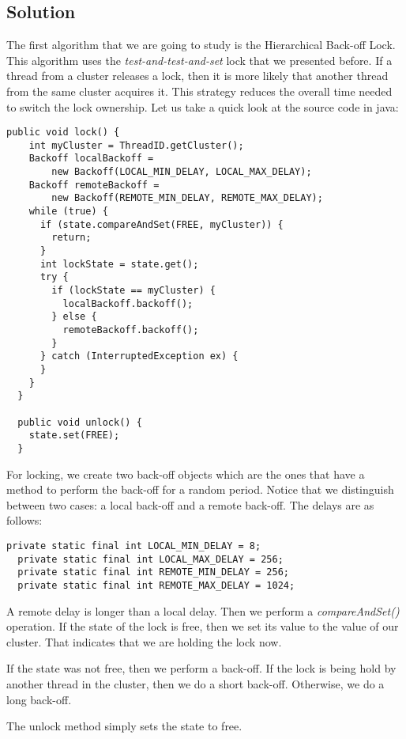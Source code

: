 \subsection{Solution}
\par
The first algorithm that we are going to study is the Hierarchical Back-off Lock.
This algorithm uses the \textit{test-and-test-and-set} lock that we presented
before. If a thread from a cluster releases a lock, then it is more likely that
another thread from the same cluster acquires it. This strategy reduces the
overall time needed to switch the lock ownership. Let us take a quick look at the
source code in java:
\par
\hfill
\begin{lstlisting}[style=numbers]
  public void lock() {
    int myCluster = ThreadID.getCluster();
    Backoff localBackoff =
        new Backoff(LOCAL_MIN_DELAY, LOCAL_MAX_DELAY);
    Backoff remoteBackoff =
        new Backoff(REMOTE_MIN_DELAY, REMOTE_MAX_DELAY);
    while (true) {
      if (state.compareAndSet(FREE, myCluster)) {
        return;
      }   
      int lockState = state.get();
      try {
        if (lockState == myCluster) {
          localBackoff.backoff();
        } else {
          remoteBackoff.backoff();
        }   
      } catch (InterruptedException ex) {
      }   
    }   
  }
  
  public void unlock() {
    state.set(FREE);
  }
\end{lstlisting}
\hfill
\par
For locking, we create two back-off objects which are the ones that have a method to
perform the back-off for a random period. Notice that we distinguish between two
cases: a local back-off and a remote back-off. The delays are as follows:
\par
\hfill
\begin{lstlisting}[style=numbers]
  private static final int LOCAL_MIN_DELAY = 8;
  private static final int LOCAL_MAX_DELAY = 256;
  private static final int REMOTE_MIN_DELAY = 256;
  private static final int REMOTE_MAX_DELAY = 1024;
\end{lstlisting}
\hfill
\par
A remote delay is longer than a local delay. Then we perform a
\textit{compareAndSet()} operation. If the state of the lock is free, then we
set its value to the value of our cluster. That indicates that we are holding
the lock now.
\par
If the state was not free, then we perform a back-off. If the lock is being hold
by another thread in the cluster, then we do a short back-off. Otherwise, we do a
long back-off.
\par
The unlock method simply sets the state to free.
